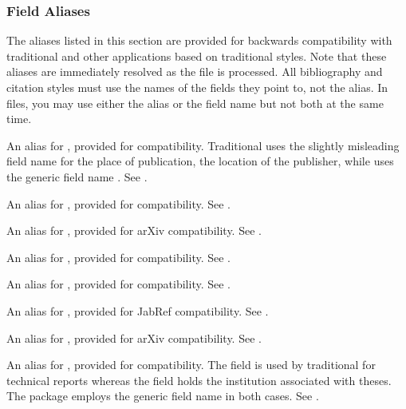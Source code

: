 \documentclass{ltxdockit}[2011/03/25]
\newcommand*{\biblatex}{\sty{biblatex}\xspace}
\begin{document}
\subsubsection{Field Aliases}
\label{bib:fld:als}

The aliases listed in this section are provided for backwards compatibility with traditional \bibtex and other applications based on traditional \bibtex styles. Note that these aliases are immediately resolved as the  file is processed. All bibliography and citation styles must use the names of the fields they point to, not the alias. In  files, you may use either the alias or the field name but not both at the same time.

\begin{fieldlist}


An alias for , provided for \bibtex compatibility. Traditional \bibtex uses the slightly misleading field name  for the place of publication, \ie the location of the publisher, while \biblatex uses the generic field name . See .


An alias for , provided for  compatibility. See .


An alias for , provided for arXiv compatibility. See . 


An alias for , provided for \bibtex compatibility. See .


An alias for , provided for \bibtex compatibility. See .


An alias for , provided for JabRef compatibility. See .


An alias for , provided for arXiv compatibility. See . 


An alias for , provided for \bibtex compatibility. The  field is used by traditional \bibtex for technical reports whereas the  field holds the institution associated with theses. The \biblatex package employs the generic field name  in both cases. See .

\end{fieldlist}
\end{document}
